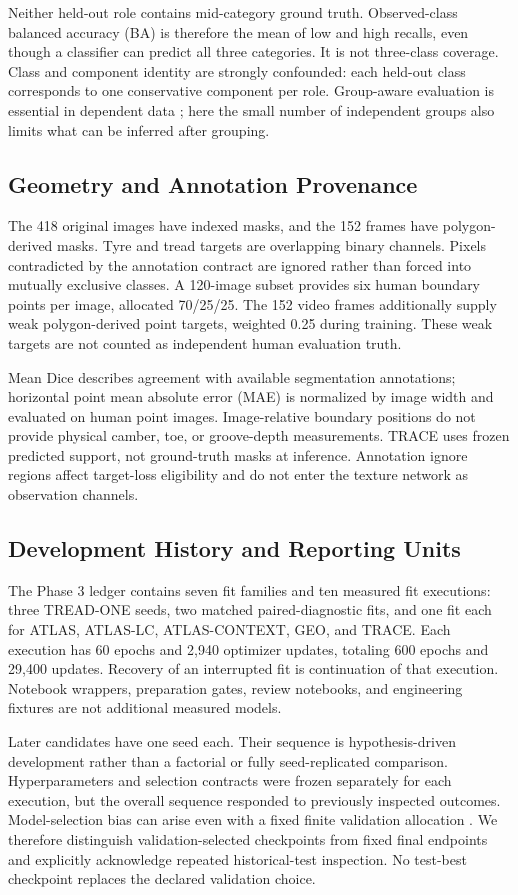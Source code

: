 Neither held-out role contains mid-category ground truth. Observed-class balanced accuracy (BA) is therefore the mean of low and high recalls, even though a classifier can predict all three categories. It is not three-class coverage. Class and component identity are strongly confounded: each held-out class corresponds to one conservative component per role. Group-aware evaluation is essential in dependent data \cite{groups}; here the small number of independent groups also limits what can be inferred after grouping.

\subsection{Geometry and Annotation Provenance}
The 418 original images have indexed masks, and the 152 frames have polygon-derived masks. Tyre and tread targets are overlapping binary channels. Pixels contradicted by the annotation contract are ignored rather than forced into mutually exclusive classes. A 120-image subset provides six human boundary points per image, allocated 70/25/25. The 152 video frames additionally supply weak polygon-derived point targets, weighted 0.25 during training. These weak targets are not counted as independent human evaluation truth.

Mean Dice describes agreement with available segmentation annotations; horizontal point mean absolute error (MAE) is normalized by image width and evaluated on human point images. Image-relative boundary positions do not provide physical camber, toe, or groove-depth measurements. TRACE uses frozen predicted support, not ground-truth masks at inference. Annotation ignore regions affect target-loss eligibility and do not enter the texture network as observation channels.

\subsection{Development History and Reporting Units}
The Phase 3 ledger contains seven fit families and ten measured fit executions: three TREAD-ONE seeds, two matched paired-diagnostic fits, and one fit each for ATLAS, ATLAS-LC, ATLAS-CONTEXT, GEO, and TRACE. Each execution has 60 epochs and 2,940 optimizer updates, totaling 600 epochs and 29,400 updates. Recovery of an interrupted fit is continuation of that execution. Notebook wrappers, preparation gates, review notebooks, and engineering fixtures are not additional measured models.

Later candidates have one seed each. Their sequence is hypothesis-driven development rather than a factorial or fully seed-replicated comparison. Hyperparameters and selection contracts were frozen separately for each execution, but the overall sequence responded to previously inspected outcomes. Model-selection bias can arise even with a fixed finite validation allocation \cite{selectionbias}. We therefore distinguish validation-selected checkpoints from fixed final endpoints and explicitly acknowledge repeated historical-test inspection. No test-best checkpoint replaces the declared validation choice.

